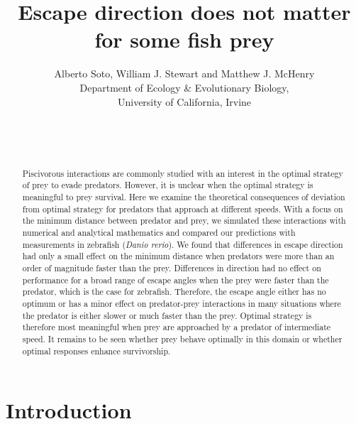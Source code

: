 \documentclass[12pt]{article}
\title{Escape direction does not matter for some fish prey}
\author{Alberto Soto, William J. Stewart and Matthew J. McHenry\\
  Department of Ecology \& Evolutionary Biology,\\
  University of California, Irvine\\ \\ \\ \\}
\begin{document}

\maketitle

\pagebreak


\begin{abstract}

Piscivorous interactions are commonly studied with an interest in the optimal strategy of prey to evade predators. However, it is unclear when the optimal strategy is meaningful to prey survival. Here we examine the theoretical consequences of deviation from optimal strategy for predators that approach at different speeds. With a focus on the minimum distance between predator and prey, we simulated these interactions with numerical and analytical mathematics and compared our predictions with measurements in zebrafish (\textit{Danio rerio}). We found that differences in escape direction had only a small effect on the minimum distance when predators were more than an order of magnitude faster than the prey. Differences in direction had no effect on performance for a broad range of escape angles when the prey were faster than the predator, which is the case for zebrafish. Therefore, the escape angle either has no optimum or has a minor effect on predator-prey interactions in many situations where the predator is either slower or much faster than the prey. Optimal strategy is therefore most meaningful when prey are approached by a predator of intermediate speed. It remains to be seen whether prey behave optimally in this domain or whether optimal responses enhance survivorship.

\end{abstract}

\pagebreak


\section{Introduction}
\label{intro}
\end{document}
